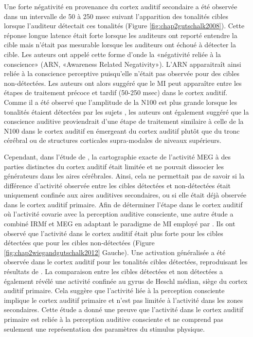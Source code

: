 Une forte négativité en provenance du cortex auditif secondaire a été observée dans un intervalle de 50 à 250 msec suivant l'apparition des tonalités cibles lorsque l'auditeur détectait ces tonalités (Figure \ref{fig:chap2gutschalk2008}). 
Cette réponse longue latence était forte lorsque les auditeurs ont reporté entendre la cible mais n'était pas mesurable lorsque les auditeurs ont échoué à détecter la cible. 
Les auteurs ont appelé cette forme d'onde la «négativité reliée à la conscience» (ARN, «Awareness Related Negativity»). 
L'ARN apparaitraît ainsi reliée à la conscience perceptive puisqu'elle n'était pas observée pour des cibles non-détectées. 
Les auteurs ont alors suggéré que le MI peut apparaître entre les étapes de traitement précoce et tardif (50-250 msec) dans le cortex auditif. 
Comme il a été observé que l'amplitude de la N100 est plus grande lorsque les tonalités étaient détectées par les sujets \citep{squires1973vertex}, les auteurs ont également suggéré que la conscience auditive proviendrait d'une étape de traitement similaire à celle de la N100 dans le cortex auditif en émergeant du cortex auditif plutôt que du tronc cérébral ou de structures corticales supra-modales de niveaux supérieurs. 

Cependant, dans l'étude de \cite{gutschalk2008neural}, la cartographie exacte de l'activité MEG à des parties distinctes du cortex auditif était limitée et ne pouvait dissocier les générateurs dans les aires cérébrales. 
Ainsi, cela ne permettait pas de savoir si la différence d'activité observée entre les cibles détectées et non-détectées était uniquement confinée aux aires auditives secondaires, ou si elle était déjà observée dans le cortex auditif primaire. 
Afin de déterminer l'étape dans le cortex auditif où l'activité covarie avec la perception auditive consciente, une autre étude \citep{wiegand2012correlates} a combiné IRMf et MEG en adaptant le paradigme de MI employé par \cite{gutschalk2008neural}. 
Ils ont observé que l'activité dans le cortex auditif était plus forte pour les cibles détectées que pour les cibles non-détectées (Figure \ref{fig:chap2wiegandgutschalk2012} Gauche). 
Une activation généralisée a été observée dans le cortex auditif pour les tonalités cibles détectées, reproduisant les résultats de \cite{gutschalk2008neural}.
La comparaison entre les cibles détectées et non détectées a également révélé une activité confinée au gyrus de Heschl médian, siège du cortex auditif primaire. 
Cela suggère que l'activité liée à la perception consciente implique le cortex auditif primaire et n'est pas limitée à l'activité dans les zones secondaires. 
Cette étude a donné une preuve que l'activité dans le cortex auditif primaire est reliée à la perception auditive consciente et ne comprend pas seulement une représentation des paramètres du stimulus physique. 

